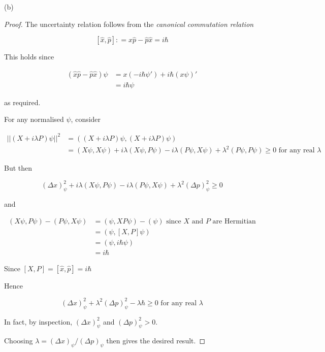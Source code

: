 \documentclass[a4paper]{article}
\begin{document}
(b)
\begin{proof}
	The uncertainty relation follows from the \emph{canonical commutation relation}



\[ [\hat{x} ,\hat{p} ] : = \hat{x}\hat{p} - \hat{p} \hat{x} = i \hbar \]

This holds since

\begin{align*}
(\hat{x}\hat{p} - \hat{p} \hat{x}) \psi & =  x ( - i \hbar \psi') + i \hbar (x \psi)' \\
& = i \hbar \psi
\end{align*}

as required.

For any normalised $ \psi $, consider 

\begin{align*}
| |   (X + i \lambda P) \psi  | |^{2}  & =  (  (X + i \lambda P)\psi, (X + i \lambda P )\psi) \\
& = (X\psi, X \psi) + i \lambda (  X \psi, P \psi) - i \lambda (P \psi, X \psi) + \lambda^{2} (P \psi, P \psi) 
\geq 0 \text{ for any real } \lambda
\end{align*}

But then

\[ (\Delta x)_{\psi}^{2} + i \lambda (X \psi, P \psi) - i \lambda(P \psi, X \psi) + \lambda^{2}  (\Delta p)_{\psi}^{2} \geq 0  \]

and

\begin{align*}
(X \psi, P \psi) - (P \psi, X \psi)  & =  (\psi, X P \psi) - (\psi) \text{ since } X \text{ and } P \text{ are Hermitian}  \\
& = (\psi, [X,P]\psi) \\
& = (\psi, i \hbar \psi) \\
& = i \hbar
\end{align*}

Since $ [X,P] = [\hat{x},\hat{p}] = i \hbar $

Hence

\[ (\Delta x)_{\psi}^{2} + \lambda^{2} (\Delta p)_{\psi}^{2} - \lambda \hbar \geq 0  \text{ for any real } \lambda \]

In fact, by inspection, $ (\Delta x)_{\psi}^{2} $ and $ (\Delta p)_{\psi}^{2} > 0 $.

Choosing $ \lambda = (\Delta x)_{\psi} / (\Delta p)_{\psi} $ then gives the desired result.

\end{proof}
\end{document}
